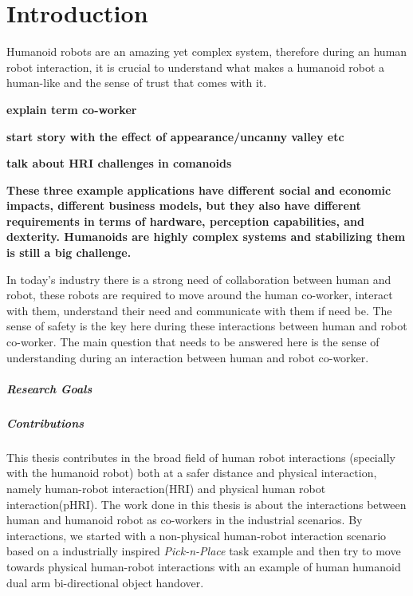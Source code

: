 {\color{blue}\chapter*{Introduction}}

Humanoid robots are an amazing yet complex system, therefore during an human robot interaction, it is crucial to understand what makes a humanoid robot a human-like and the sense of trust that comes with it.

\textbf{explain term co-worker}

\textbf{start story with the effect of appearance/uncanny valley etc}

\textbf{talk about HRI challenges in comanoids}

\textbf{These three example applications have different social and economic impacts, different business models, but they also have different requirements in terms of hardware, perception capabilities, and dexterity. Humanoids are highly complex systems and stabilizing them is still a big challenge.
}

In today's industry there is a strong need of collaboration between human and robot, these robots are required to move around the human co-worker, interact with them, understand their need and communicate with them if need be. The sense of safety is the key here during these interactions between human and robot co-worker. The main question that needs to be answered here is the sense of understanding during an interaction between human and robot co-worker.

\paragraph*{Research Goals\\}

\paragraph*{Contributions\\}

This thesis contributes in the broad field of human robot interactions (specially with the humanoid robot) both at a safer distance and physical interaction, namely human-robot interaction(HRI) and physical human robot interaction(pHRI). The work done in this thesis is about the interactions between human and humanoid robot as co-workers in the industrial scenarios. By interactions, we started with a non-physical human-robot interaction scenario based on a industrially inspired \textit{Pick-n-Place} task example and then try to move towards physical human-robot interactions with an example of human humanoid dual arm bi-directional object handover.


